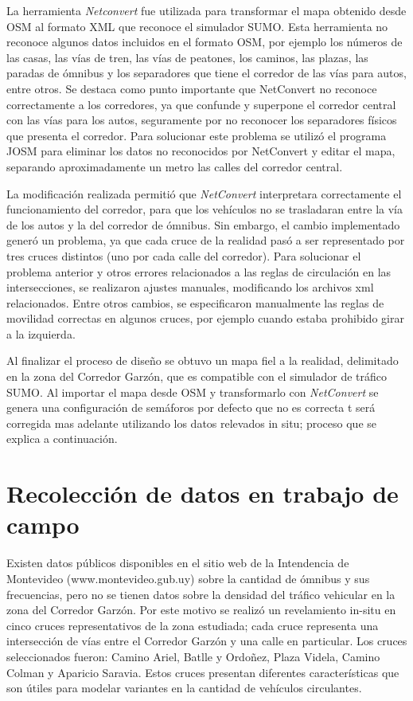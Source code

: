La herramienta \emph{Netconvert} fue utilizada para transformar el mapa obtenido desde OSM al formato XML que reconoce el simulador SUMO. Esta herramienta no reconoce algunos datos incluidos en el formato OSM, por ejemplo los números de las casas, las vías de tren, las vías de peatones, los caminos, las plazas, las paradas de ómnibus y los separadores que tiene el corredor de las vías para autos, entre otros. Se destaca como punto importante que NetConvert no reconoce correctamente a los corredores, ya que confunde y superpone el corredor central con las vías para los autos, seguramente por no reconocer los separadores físicos que presenta el corredor. Para solucionar este problema se utilizó el programa JOSM para eliminar los datos no reconocidos por NetConvert y editar el mapa, separando aproximadamente un metro las calles del corredor central.

La modificación realizada permitió que \emph{NetConvert} interpretara correctamente el funcionamiento del corredor, para que los vehículos no se trasladaran entre la vía de los autos y la del corredor de ómnibus. Sin embargo, el cambio implementado generó un problema, ya que cada cruce de la realidad pasó a ser representado por tres cruces distintos (uno por cada calle del corredor). Para solucionar el problema anterior y otros errores relacionados a las reglas de circulación en las intersecciones, se realizaron ajustes manuales, modificando los archivos xml relacionados. Entre otros cambios, se especificaron manualmente las reglas de movilidad correctas en algunos cruces, por ejemplo cuando estaba prohibido girar a la izquierda.

Al finalizar el proceso de diseño se obtuvo un mapa fiel a la realidad, delimitado en la zona del Corredor Garzón, que es compatible con el simulador de tráfico SUMO. Al importar el mapa desde OSM y transformarlo con \emph{NetConvert} se genera una configuración de semáforos por defecto que no es correcta t será corregida mas adelante utilizando los datos relevados in situ; proceso que se explica a continuación.


\section{Recolección de datos en trabajo de campo}

Existen datos públicos disponibles en el sitio web de la Intendencia de Montevideo (www.montevideo.gub.uy) sobre la cantidad de ómnibus y sus frecuencias, pero no se tienen datos sobre la densidad del tráfico vehicular en la zona del Corredor Garzón. Por este motivo se realizó un revelamiento in-situ en cinco cruces representativos de la zona estudiada; cada cruce representa una intersección de vías entre el Corredor Garzón y una calle en particular. Los cruces seleccionados fueron: Camino Ariel, Batlle y Ordoñez, Plaza Videla, Camino Colman y Aparicio Saravia. Estos cruces presentan diferentes características que son útiles para modelar variantes en la cantidad de vehículos circulantes. 

